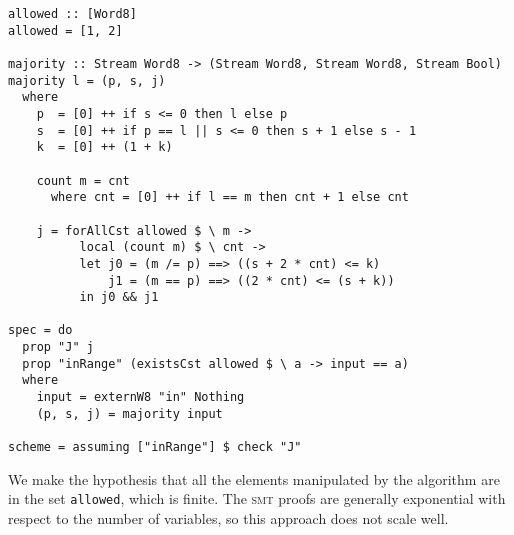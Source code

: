 \begin{lstlisting}[frame=single]
allowed :: [Word8]
allowed = [1, 2]

majority :: Stream Word8 -> (Stream Word8, Stream Word8, Stream Bool)
majority l = (p, s, j)
  where
    p  = [0] ++ if s <= 0 then l else p
    s  = [0] ++ if p == l || s <= 0 then s + 1 else s - 1
    k  = [0] ++ (1 + k)
    
    count m = cnt
      where cnt = [0] ++ if l == m then cnt + 1 else cnt
    
    j = forAllCst allowed $ \ m ->
          local (count m) $ \ cnt ->
          let j0 = (m /= p) ==> ((s + 2 * cnt) <= k)
              j1 = (m == p) ==> ((2 * cnt) <= (s + k))
          in j0 && j1

spec = do
  prop "J" j
  prop "inRange" (existsCst allowed $ \ a -> input == a)
  where
    input = externW8 "in" Nothing
    (p, s, j) = majority input

scheme = assuming ["inRange"] $ check "J"
\end{lstlisting}

We make the hypothesis that all the elements
manipulated by the algorithm are in the set \texttt{allowed}, which is
finite. The \textsc{smt} proofs are generally exponential with respect to the number of
variables, so this approach does not scale well.
